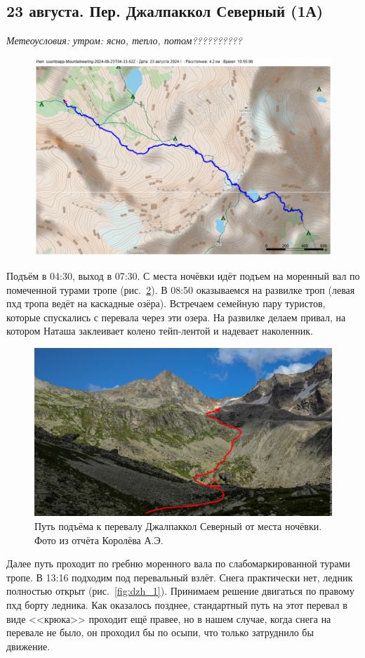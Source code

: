 \subsection{23 августа.  Пер. Джалпаккол Северный (1А)}
\textit{Метеоусловия: утром: ясно, тепло, потом??????????}

\begin{figure}[h!]
	\centering
	\includegraphics[angle=0, width=0.7\linewidth]{../pics/mini_maps/23}
	\label{fig:mini_23}
\end{figure}


Подъём в 04:30, выход в 07:30. С места ночёвки идёт подъем на моренный вал по помеченной турами тропе (рис.~\ref{fig:23augstart}). В 08:50 оказываемся на развилке троп (левая пхд тропа ведёт на каскадные озёра). Встречаем семейную пару туристов, которые спускались с перевала через эти озера. На развилке делаем привал, на котором Наташа заклеивает колено тейп-лентой и надевает наколенник.

\begin{figure}[h!]
	\centering
	\includegraphics[angle=0, width=0.7\linewidth]{../pics/23augstart}
	\caption{Путь подъёма к перевалу Джалпаккол Северный от места ночёвки. Фото из отчёта Королёва А.Э. \cite{Korolyov2018}}
	\label{fig:23augstart}
\end{figure}

 Далее путь проходит по гребню моренного вала по слабомаркированной турами тропе. В 13:16 подходим под перевальный взлёт. Снега практически нет, ледник полностью открыт (рис.~\ref{fig:dzh_1}). Принимаем решение двигаться по правому пхд борту ледника. Как оказалось позднее, стандартный путь на этот перевал в виде <<крюка>> проходит ещё правее, но в нашем случае, когда снега на перевале не было, он проходил бы по осыпи, что только затруднило бы движение.
 



